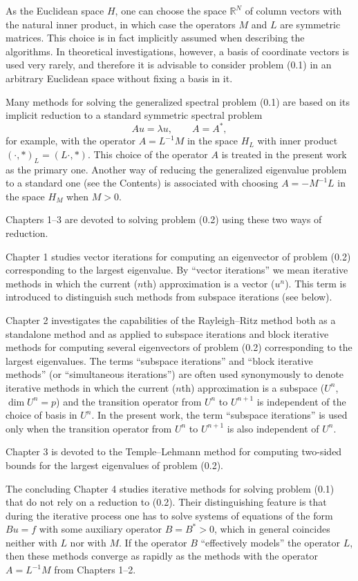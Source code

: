 \documentclass[11pt,oneside]{book}
\begin{document}
As the Euclidean space $H$, one can choose the space $\mathbb{R}^N$ of column vectors with the natural inner product, in which case the operators $M$ and $L$ are symmetric matrices. This choice is in fact implicitly assumed when describing the algorithms. In theoretical investigations, however, a basis of coordinate vectors is used very rarely, and therefore it is advisable to consider problem (0.1) in an arbitrary Euclidean space without fixing a basis in it.

Many methods for solving the generalized spectral problem (0.1) are based on its implicit reduction to a standard symmetric spectral problem
\[
Au = \lambda u, \qquad A = A^*, \tag{0.2}
\]
for example, with the operator $A = L^{-1}M$ in the space $H_L$ with inner product $(\cdot, \ast)_L = (L\cdot, \ast)$. This choice of the operator $A$ is treated in the present work as the primary one. Another way of reducing the generalized eigenvalue problem to a standard one (see the Contents) is associated with choosing $A = -M^{-1}L$ in the space $H_M$ when $M > 0$.

Chapters 1--3 are devoted to solving problem (0.2) using these two ways of reduction.

Chapter 1 studies vector iterations for computing an eigenvector of problem (0.2) corresponding to the largest eigenvalue. By ``vector iterations'' we mean iterative methods in which the current ($n$th) approximation is a vector ($u^n$). This term is introduced to distinguish such methods from subspace iterations (see below).

Chapter 2 investigates the capabilities of the Rayleigh--Ritz method both as a standalone method and as applied to subspace iterations and block iterative methods for computing several eigenvectors of problem (0.2) corresponding to the largest eigenvalues. The terms ``subspace iterations'' and ``block iterative methods'' (or ``simultaneous iterations'') are often used synonymously to denote iterative methods in which the current ($n$th) approximation is a subspace ($U^n$, $\dim U^n = p$) and the transition operator from $U^n$ to $U^{n+1}$ is independent of the choice of basis in $U^n$. In the present work, the term ``subspace iterations'' is used only when the transition operator from $U^n$ to $U^{n+1}$ is also independent of $U^n$.

Chapter 3 is devoted to the Temple--Lehmann method for computing two-sided bounds for the largest eigenvalues of problem (0.2).

The concluding Chapter 4 studies iterative methods for solving problem (0.1) that do not rely on a reduction to (0.2). Their distinguishing feature is that during the iterative process one has to solve systems of equations of the form $Bu = f$ with some auxiliary operator $B = B^* > 0$, which in general coincides neither with $L$ nor with $M$. If the operator $B$ ``effectively models'' the operator $L$, then these methods converge as rapidly as the methods with the operator $A = L^{-1}M$ from Chapters 1--2.
\end{document}

